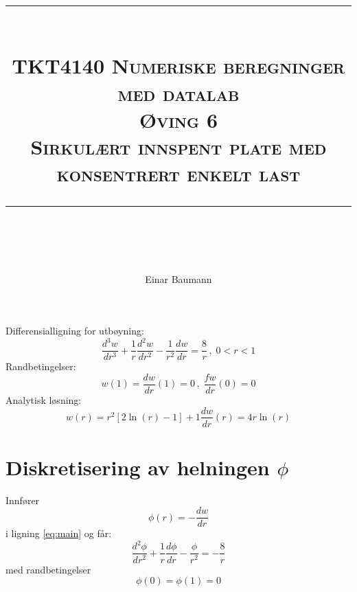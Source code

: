



\usepackage{etex}
\usepackage{tikz,pgfplots}
\pgfplotsset{compat=1.9}
\usetikzlibrary{arrows,decorations.markings}


\author{Einar Baumann}
\title{
    \vspace{-1in}
    \vspace{0.1in}
    \rule{\textwidth}{0.5pt} \\[0.5cm]
    \normalfont \normalsize \textsc{TKT4140 Numeriske beregninger med datalab} \\ [20pt]
    {\textsc{ \huge Øving 6 }} \\ [0.5cm]
    {\textsc {\Large Sirkulært innspent plate med konsentrert enkelt last} } \\
    \vspace{0.1in}
    \rule{\textwidth}{2pt} \\[0.7cm]
}


\maketitle
\thispagestyle{empty}
\clearpage

\noindent Differensialligning for utbøyning:
\begin{equation}
  \frac{d^3 w}{dr^3} + \frac{1}{r} \frac{d^2 w}{dr^2} - \frac{1}{r^2} \frac{dw}{dr} = \frac{8}{r} \, , \; 0 < r < 1 \label{eq:main}
\end{equation}
Randbetingelser:
\begin{equation}
  w(1) = \frac{dw}{dr}(1) = 0 \, , \; \frac{fw}{dr}(0) = 0 \tag{b}
\end{equation}
Analytisk løsning:
\begin{subequations}
\begin{equation}
  w(r) = r^2 \left[ 2 \ln(r) - 1 \right] + 1 \label{eq:analytical_w}
\end{equation}
\begin{equation}
  \frac{dw}{dr}(r) = 4 r \ln (r) \label{eq:analytical_dw}
\end{equation}
\end{subequations}


\section{Diskretisering av helningen $\phi$} %
\label{sec:diskretisering_av_helningen_phi_}
Innfører
\begin{equation}
  \phi(r) = - \frac{dw}{dr}
\end{equation}
i ligning \eqref{eq:main} og får:
\begin{equation}
  \frac{d^2 \phi}{dr^2} + \frac{1}{r} \frac{d \phi}{dr} - \frac{\phi}{r^2} = -\frac{8}{r} \label{eq:main_med_helning}
\end{equation}
med randbetingelser
\begin{equation}
  \phi(0) = \phi(1) = 0 \tag{b}
\end{equation}

